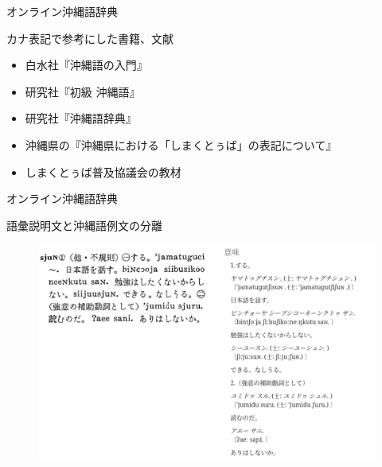 \documentclass[14pt]{beamer}
\begin{document}
\begin{frame}{オンライン沖縄語辞典}
  \begin{block}{カナ表記で参考にした書籍、文献}
    \vspace{0pt}
    \begin{itemize}
    \item 白水社『沖縄語の入門』
    \item 研究社『初級 沖縄語』
    \item 研究社『沖縄語辞典』
    \item 沖縄県の『沖縄県における「しまくとぅば」の表記について』
    \item しまくとぅば普及協議会の教材
    \end{itemize}
  \end{block}
\end{frame}



\begin{frame}{オンライン沖縄語辞典}
  \begin{block}{語彙説明文と沖縄語例文の分離}
    \begin{figure}[ht]
      \centering
      \begin{minipage}{\paperwidth}
        \includegraphics[height=0.6\paperheight,width=0.7\paperwidth]{okinawago-app-explanation-example.png}
      \end{minipage}
    \end{figure}
  \end{block}
\end{frame}
\end{document}

